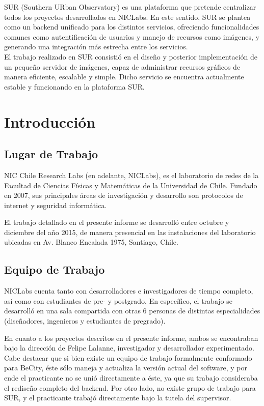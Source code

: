 \documentclass[11pt,letterpaper]{article}
\begin{document}
SUR (Southern URban Observatory) es una plataforma que pretende centralizar todos los proyectos desarrollados en NICLabs. En este sentido, SUR se plantea como un backend unificado para los distintos servicios, ofreciendo funcionalidades comunes como autentificación de usuarios y manejo de recursos como imágenes, y generando una integración más estrecha entre los servicios.\\

El trabajo realizado en SUR consistió en el diseño y posterior implementación de un pequeño servidor de imágenes, capaz de administrar recursos gráficos de manera eficiente, escalable y simple. Dicho servicio se encuentra actualmente estable y funcionando en la plataforma SUR.
\newpage
\section{Introducción}
\subsection{Lugar de Trabajo}

NIC Chile Research Labs (en adelante, NICLabs)\cite{niclabs}, es el laboratorio de redes de la Facultad de Ciencias Físicas y Matemáticas de la Universidad de Chile. Fundado en 2007, sus principales áreas de investigación y desarrollo son protocolos de internet y seguridad informática.

El trabajo detallado en el presente informe se desarrolló entre octubre y diciembre del año 2015, de manera presencial en las instalaciones del laboratorio ubicadas en Av. Blanco Encalada 1975, Santiago, Chile.

\subsection{Equipo de Trabajo}


NICLabs cuenta tanto con desarrolladores e investigadores de tiempo completo, así como con estudiantes de pre- y postgrado. En específico, el trabajo se desarrolló en una sala compartida con otras 6 personas de distintas especialidades (diseñadores, ingenieros y estudiantes de pregrado).

En cuanto a los proyectos descritos en el presente informe, ambos se encontraban bajo la dirección de Felipe Lalanne\cite{lalanne}, investigador y desarrollador experimentado. Cabe destacar que si bien existe un equipo de trabajo formalmente conformado para BeCity, éste sólo maneja y actualiza la versión actual del software, y por ende el practicante no se unió directamente a éste, ya que su trabajo consideraba el rediseño completo del backend.
Por otro lado, no existe grupo de trabajo para SUR, y el practicante trabajó directamente bajo la tutela del supervisor.
\end{document}
